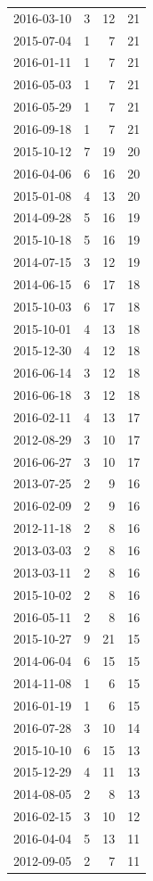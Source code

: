 \begin{tabular}{lrrr}
2016-03-10 & 3 & 12 & 21 \\
2015-07-04 & 1 & 7 & 21 \\
2016-01-11 & 1 & 7 & 21 \\
2016-05-03 & 1 & 7 & 21 \\
2016-05-29 & 1 & 7 & 21 \\
2016-09-18 & 1 & 7 & 21 \\
2015-10-12 & 7 & 19 & 20 \\
2016-04-06 & 6 & 16 & 20 \\
2015-01-08 & 4 & 13 & 20 \\
2014-09-28 & 5 & 16 & 19 \\
2015-10-18 & 5 & 16 & 19 \\
2014-07-15 & 3 & 12 & 19 \\
2014-06-15 & 6 & 17 & 18 \\
2015-10-03 & 6 & 17 & 18 \\
2015-10-01 & 4 & 13 & 18 \\
2015-12-30 & 4 & 12 & 18 \\
2016-06-14 & 3 & 12 & 18 \\
2016-06-18 & 3 & 12 & 18 \\
2016-02-11 & 4 & 13 & 17 \\
2012-08-29 & 3 & 10 & 17 \\
2016-06-27 & 3 & 10 & 17 \\
2013-07-25 & 2 & 9 & 16 \\
2016-02-09 & 2 & 9 & 16 \\
2012-11-18 & 2 & 8 & 16 \\
2013-03-03 & 2 & 8 & 16 \\
2013-03-11 & 2 & 8 & 16 \\
2015-10-02 & 2 & 8 & 16 \\
2016-05-11 & 2 & 8 & 16 \\
2015-10-27 & 9 & 21 & 15 \\
2014-06-04 & 6 & 15 & 15 \\
2014-11-08 & 1 & 6 & 15 \\
2016-01-19 & 1 & 6 & 15 \\
2016-07-28 & 3 & 10 & 14 \\
2015-10-10 & 6 & 15 & 13 \\
2015-12-29 & 4 & 11 & 13 \\
2014-08-05 & 2 & 8 & 13 \\
2016-02-15 & 3 & 10 & 12 \\
2016-04-04 & 5 & 13 & 11 \\
2012-09-05 & 2 & 7 & 11 \\

\end{tabular}
